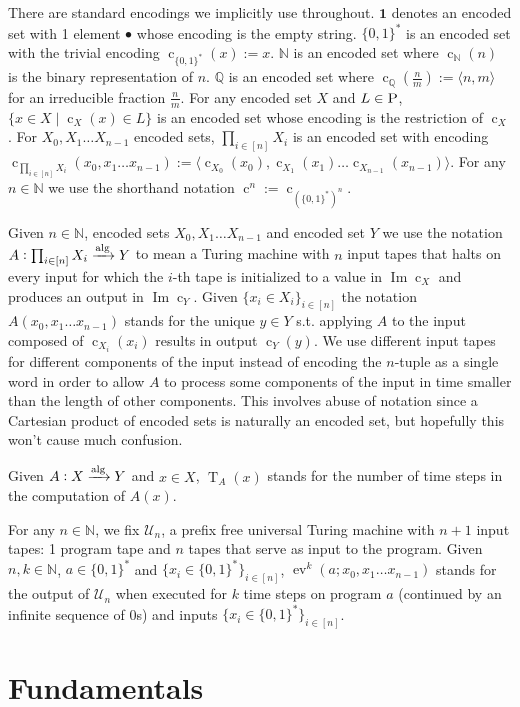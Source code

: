 \documentclass{article}
\numberwithin{equation}{section}
\theoremstyle{definition}
\theoremstyle{plain}
\newcommand{\Bool}{\{0,1\}}
\newcommand{\Words}{{\Bool^*}}
\DeclareMathOperator{\Img}{Im}
\DeclareMathOperator{\Ev}{ev}
\DeclareMathOperator{\T}{T}
\DeclareMathOperator{\En}{c}
\newcommand{\Nats}{\mathbb{N}}
\newcommand{\Rats}{\mathbb{Q}}
\newcommand{\Chev}[1]{\langle #1 \rangle}
\newcommand{\Alg}{\xrightarrow{\textnormal{alg}}}
\begin{document}
There are standard encodings we implicitly use throughout. $\bm{1}$ denotes an encoded set with 1 element $\bullet$ whose encoding is the empty string. $\Words$ is an encoded set with the trivial encoding ${\En_\Words(x):=x}$. $\Nats$ is an encoded set where $\En_\Nats(n)$ is the binary representation of $n$. $\Rats$ is an encoded set where ${\En_\Rats(\frac{n}{m}):=\Chev{n,m}}$ for an irreducible fraction $\frac{n}{m}$. For any encoded set $X$ and $L \in \textsc{P}$, $\{x \in X \mid \En_X(x) \in L\}$ is an encoded set whose encoding is the restriction of $\En_X$. For $X_0,X_1 \ldots X_{n-1}$ encoded sets, $\prod_{i \in [n]} X_i$ is an encoded set with encoding $\En_{\prod_{i \in [n]} X_i}(x_0,x_1 \ldots x_{n-1}):=\Chev{\En_{X_0}(x_0),\En_{X_1}(x_1) \ldots \En_{X_{n-1}}(x_{n-1})}$. For any $n \in \Nats$ we use the shorthand notation $\En^n:=\En_{(\Words)^n}$.

Given $n \in \Nats$, encoded sets $X_0, X_1 \ldots X_{n-1}$ and encoded set $Y$ we use the notation ${A: \prod_{i \in [n]} X_i \Alg Y}$ to mean a Turing machine with $n$ input tapes that halts on every input for which the $i$-th tape is initialized to a value in $\Img \En_X$ and produces an output in $\Img \En_Y$. Given $\{x_i \in X_i\}_{i \in [n]}$ the notation $A(x_0, x_1 \ldots x_{n-1})$ stands for the unique $y \in Y$ s.t. applying $A$ to the input composed of $\En_{X_i}(x_i)$ results in output $\En_Y(y)$. We use different input tapes for different components of the input instead of encoding the $n$-tuple as a single word in order to allow $A$ to process some components of the input in time smaller than the length of other components. This involves abuse of notation since a Cartesian product of encoded sets is naturally an encoded set, but hopefully this won't cause much confusion.

Given $A: X \Alg Y$ and $x \in X$, $\T_A(x)$ stands for the number of time steps in the computation of $A(x)$.

For any $n \in \Nats$, we fix $\mathcal{U}_n$, a prefix free universal Turing machine with $n+1$ input tapes: 1 program tape and $n$ tapes that serve as input to the program. Given ${n,k \in \Nats}$, ${a \in \Words}$ and ${\{x_i \in \Words\}_{i \in [n]}}$, ${\Ev^k(a;x_0,x_1 \ldots x_{n-1})}$ stands for the output of ${\mathcal{U}_n}$ when executed for ${k}$ time steps on program ${a}$ (continued by an infinite sequence of 0s) and inputs ${\{x_i \in \Words\}_{i \in [n]}}$.

\section{Fundamentals}
\label{sec:fundamentals}
\end{document}
